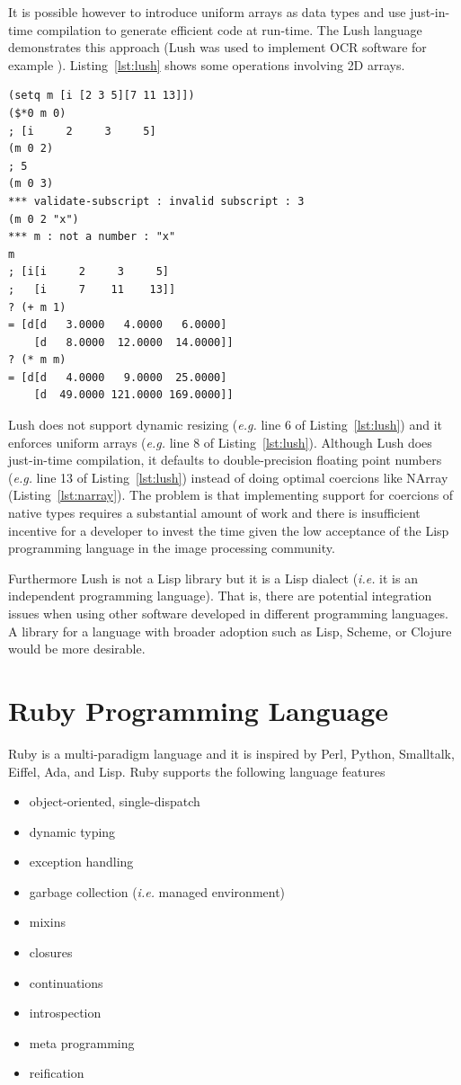 \documentclass[12pt,a4paper,oneside,openright]{book}
\newcommand{\eg}{\emph{e.g.} }
\newcommand{\ie}{\emph{i.e.} }
\newcommand{\Ie}{That is, }
\newcommand{\lst}[1]{Listing~\ref{lst:#1}}
\newcommand{\lispout}{Comment lines (preceded with ``;'') show the output of the program}
\begin{document}
\begin{CJK}{UTF8}{}
It is possible however to introduce uniform arrays as data types and use just-in-time compilation to generate efficient code at run-time. The Lush language demonstrates this approach (Lush was used to implement \ac{OCR} software for example \citep{726791}). \lst{lush} shows some operations involving \ac{2D} arrays.
\lstset{language=Lisp,frame=single,numbers=left}
\begin{lstlisting}[float=htbp,caption={Lush programming language. \lispout},label=lst:lush]
(setq m [i [2 3 5][7 11 13]])
($*0 m 0)
; [i     2     3     5]
(m 0 2)
; 5
(m 0 3)
*** validate-subscript : invalid subscript : 3
(m 0 2 "x")
*** m : not a number : "x"
m
; [i[i     2     3     5]
;   [i     7    11    13]]
? (+ m 1)
= [d[d   3.0000   4.0000   6.0000]
    [d   8.0000  12.0000  14.0000]]
? (* m m)
= [d[d   4.0000   9.0000  25.0000]
    [d  49.0000 121.0000 169.0000]]
\end{lstlisting}
Lush does not support dynamic resizing (\eg line 6 of \lst{lush}) and it enforces uniform arrays (\eg line 8 of \lst{lush}). Although Lush does just-in-time compilation, it defaults to double-precision floating point numbers (\eg line 13 of \lst{lush}) instead of doing optimal coercions like NArray (\lst{narray}). The problem is that implementing support for coercions of native types requires a substantial amount of work and there is insufficient incentive for a developer to invest the time given the low acceptance of the Lisp programming language in the image processing community.

Furthermore Lush is not a Lisp library but it is a Lisp dialect (\ie it is an independent programming language). \Ie there are potential integration issues when using other software developed in different programming languages. A library for a language with broader adoption such as Lisp, Scheme, or Clojure would be more desirable.

\section{Ruby Programming Language}\label{cha:ruby}
Ruby is a multi-paradigm language and it is inspired by Perl, Python, Smalltalk, Eiffel, Ada, and Lisp. Ruby supports the following language features
\begin{itemize}
\item object-oriented, single-dispatch
\item dynamic typing
\item exception handling
\item garbage collection (\ie managed environment)
\item mixins
\item closures
\item continuations
\item introspection
\item meta programming
\item reification
\end{itemize}


\end{CJK}
\end{document}
